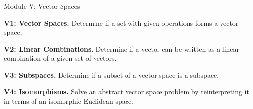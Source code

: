 
\begin{module}{Module V: Vector Spaces}

\begin{moduleStandards}
  \item \textbf{V1: Vector Spaces.}
        Determine if a set with given operations forms a vector space.
  \item \textbf{V2: Linear Combinations.}
        Determine if a vector can be written as a linear combination of
        a given set of vectors.
  \item \textbf{V3: Subspaces.}
        Determine if a subset of a vector space is a subspace.
  \item \textbf{V4: Isomorphisms.}
        Solve an abstract vector space problem by reinterpreting it in
        terms of an isomorphic Euclidean space.
\end{moduleStandards}







\end{module}
